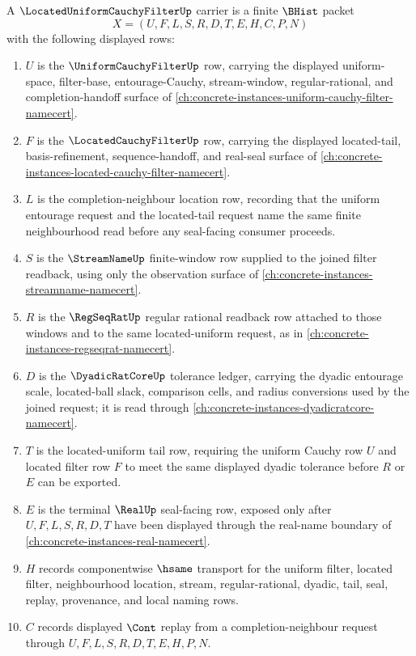 \begin{definition}
\label{def:located-uniform-cauchy-filter-carrier}
A $\LocatedUniformCauchyFilterUp$ carrier is a finite $\BHist$ packet
$$
X=(U,F,L,S,R,D,T,E,H,C,P,N)
$$
with the following displayed rows:
\begin{enumerate}
\item $U$ is the $\UniformCauchyFilterUp$ row, carrying the displayed uniform-space, filter-base, entourage-Cauchy, stream-window, regular-rational, and completion-handoff surface of \autoref{ch:concrete-instances-uniform-cauchy-filter-namecert}.
\item $F$ is the $\LocatedCauchyFilterUp$ row, carrying the displayed located-tail, basis-refinement, sequence-handoff, and real-seal surface of \autoref{ch:concrete-instances-located-cauchy-filter-namecert}.
\item $L$ is the completion-neighbour location row, recording that the uniform entourage request and the located-tail request name the same finite neighbourhood read before any seal-facing consumer proceeds.
\item $S$ is the $\StreamNameUp$ finite-window row supplied to the joined filter readback, using only the observation surface of \autoref{ch:concrete-instances-streamname-namecert}.
\item $R$ is the $\RegSeqRatUp$ regular rational readback row attached to those windows and to the same located-uniform request, as in \autoref{ch:concrete-instances-regseqrat-namecert}.
\item $D$ is the $\DyadicRatCoreUp$ tolerance ledger, carrying the dyadic entourage scale, located-ball slack, comparison cells, and radius conversions used by the joined request; it is read through \autoref{ch:concrete-instances-dyadicratcore-namecert}.
\item $T$ is the located-uniform tail row, requiring the uniform Cauchy row $U$ and located filter row $F$ to meet the same displayed dyadic tolerance before $R$ or $E$ can be exported.
\item $E$ is the terminal $\RealUp$ seal-facing row, exposed only after $U,F,L,S,R,D,T$ have been displayed through the real-name boundary of \autoref{ch:concrete-instances-real-namecert}.
\item $H$ records componentwise $\hsame$ transport for the uniform filter, located filter, neighbourhood location, stream, regular-rational, dyadic, tail, seal, replay, provenance, and local naming rows.
\item $C$ records displayed $\Cont$ replay from a completion-neighbour request through $U,F,L,S,R,D,T,E,H,P,N$.

\end{enumerate}
\end{definition}
